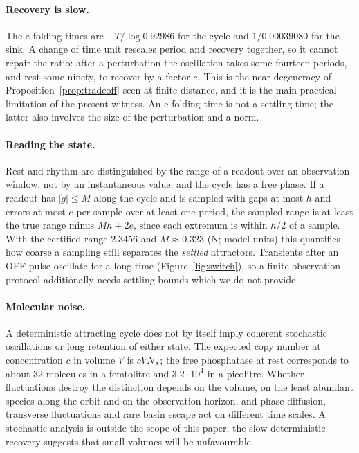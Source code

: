 \documentclass[11pt,a4paper]{article}
\theoremstyle{plain}
\theoremstyle{definition}
\theoremstyle{remark}
\newcommand{\abs}[1]{\lvert#1\rvert}
\newcommand{\evN}{\textsf{N}}
\begin{document}
\paragraph{Recovery is slow.} The e-folding times are $-T/\log0.92986$ for the cycle and $1/0.00039080$ for the sink. A change of time unit rescales period and recovery together, so it cannot repair the ratio: after a perturbation the oscillation takes some fourteen periods, and rest some ninety, to recover by a factor $e$. This is the near-degeneracy of Proposition~\ref{prop:tradeoff} seen at finite distance, and it is the main practical limitation of the present witness. An e-folding time is not a settling time; the latter also involves the size of the perturbation and a norm.

\paragraph{Reading the state.} Rest and rhythm are distinguished by the range of a readout over an observation window, not by an instantaneous value, and the cycle has a free phase. If a readout has $\abs{\dot g}\le M$ along the cycle and is sampled with gaps at most $h$ and errors at most $e$ per sample over at least one period, the sampled range is at least the true range minus $Mh+2e$, since each extremum is within $h/2$ of a sample. With the certified range $2.3456$ and $M\approx0.323$ (\evN; model units) this quantifies how coarse a sampling still separates the \emph{settled} attractors. Transients after an OFF pulse oscillate for a long time (Figure~\ref{fig:switch}), so a finite observation protocol additionally needs settling bounds which we do not provide.

\paragraph{Molecular noise.} A deterministic attracting cycle does not by itself imply coherent stochastic oscillations or long retention of either state. The expected copy number at concentration $c$ in volume $V$ is $cVN_{\mathrm A}$; the free phosphatase at rest corresponds to about $32$ molecules in a femtolitre and $3.2\cdot10^4$ in a picolitre. Whether fluctuations destroy the distinction depends on the volume, on the least abundant species along the orbit and on the observation horizon, and phase diffusion, transverse fluctuations and rare basin escape act on different time scales. A stochastic analysis \cite{Gillespie77} is outside the scope of this paper; the slow deterministic recovery suggests that small volumes will be unfavourable.
\end{document}
